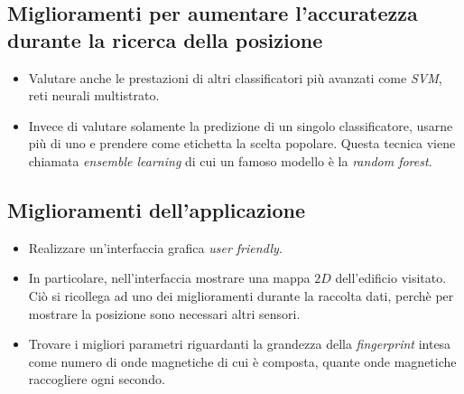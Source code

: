 \subsection{Miglioramenti per aumentare l'accuratezza durante la ricerca della posizione}
\begin{itemize}
	\item Valutare anche le prestazioni di altri classificatori pi\`u avanzati come \textit{SVM}, reti neurali multistrato.
	\item Invece di valutare solamente la predizione di un singolo classificatore, usarne pi\`u di uno e prendere come etichetta la scelta popolare. Questa tecnica viene chiamata \textit{ensemble learning} di cui un famoso modello \`e la \textit{random forest}.
\end{itemize}
\subsection{Miglioramenti dell'applicazione}
\begin{itemize}
	\item Realizzare un'interfaccia grafica \textit{user friendly}.
	\item In particolare, nell'interfaccia mostrare una mappa $2D$ dell'edificio visitato. Ci\`o si ricollega ad uno dei miglioramenti durante la raccolta dati, perch\`e per mostrare la posizione sono necessari altri sensori.
	\item Trovare i migliori parametri riguardanti la grandezza della \textit{fingerprint} intesa come numero di onde magnetiche di cui \`e composta, quante onde magnetiche raccogliere ogni secondo.
\end{itemize}
